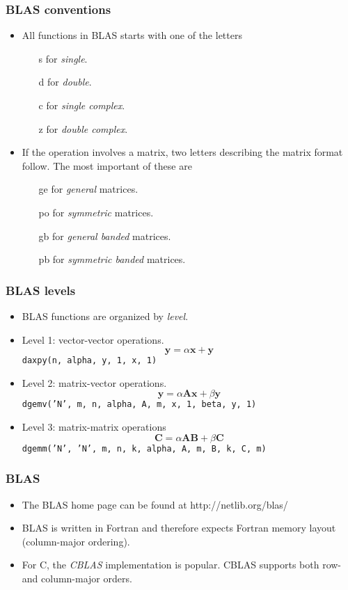 \begin{frame}
  \frametitle{BLAS conventions}
  \begin{itemize}
  \item All functions in BLAS starts with one of the letters
    \begin{itemize}
    \item[s] for \emph{single}.
    \item[d] for \emph{double}.
    \item[c] for \emph{single complex}.
    \item[z] for \emph{double complex}.
    \end{itemize}
  \item If the operation involves a matrix, two letters describing the matrix
    format follow. The most important of these are
    \begin{itemize}
    \item[ge] for \emph{general} matrices.
    \item[po] for \emph{symmetric} matrices.
    \item[gb] for \emph{general banded} matrices.
    \item[pb] for \emph{symmetric banded} matrices.
    \end{itemize}
  \end{itemize}
\end{frame}

\begin{frame}
  \frametitle{BLAS levels}
  \begin{itemize}
  \item BLAS functions are organized by \emph{level}.
  \item Level 1: vector-vector operations.
    \[ \bm y = \alpha \bm x + \bm y \]
    \texttt{daxpy(n, alpha, y, 1, x, 1)}
  \item Level 2: matrix-vector operations.
    \[ \bm y = \alpha \bm A \bm x + \beta \bm y \]
    \texttt{dgemv('N', m, n, alpha, A, m, x, 1, beta, y, 1)}
  \item Level 3: matrix-matrix operations
    \[ \bm C = \alpha \bm A \bm B + \beta \bm C \]
    \texttt{dgemm('N', 'N', m, n, k, alpha, A, m, B, k, C, m)}
  \end{itemize}
\end{frame}

\begin{frame}
  \frametitle{BLAS}
  \begin{itemize}
  \item The BLAS home page can be found at http://netlib.org/blas/
  \item BLAS is written in Fortran and therefore expects Fortran memory layout
    (column-major ordering).
  \item For C, the \emph{CBLAS} implementation is popular. CBLAS supports both
    row- and column-major orders.
  \end{itemize}
\end{frame}

